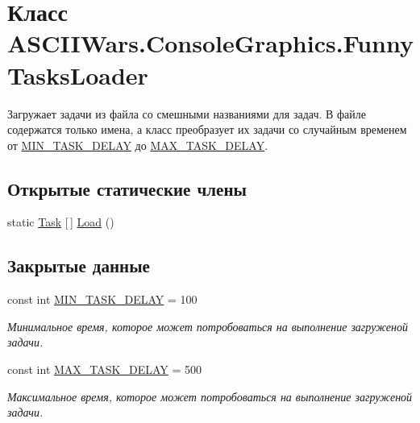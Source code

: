 \hypertarget{class_a_s_c_i_i_wars_1_1_console_graphics_1_1_funny_tasks_loader}{}\section{Класс A\+S\+C\+I\+I\+Wars.\+Console\+Graphics.\+Funny\+Tasks\+Loader}
\label{class_a_s_c_i_i_wars_1_1_console_graphics_1_1_funny_tasks_loader}


Загружает задачи из файла со смешными названиями для задач. В файле содержатся только имена, а класс преобразует их задачи со случайным временем от \hyperlink{class_a_s_c_i_i_wars_1_1_console_graphics_1_1_funny_tasks_loader_a9008864a7b23b6e86b350b5c2097151c}{M\+I\+N\+\_\+\+T\+A\+S\+K\+\_\+\+D\+E\+L\+AY} до \hyperlink{class_a_s_c_i_i_wars_1_1_console_graphics_1_1_funny_tasks_loader_a0c34f365b46e3cc7e9974d5412b05f6c}{M\+A\+X\+\_\+\+T\+A\+S\+K\+\_\+\+D\+E\+L\+AY}.  


\subsection*{Открытые статические члены}
\begin{DoxyCompactItemize}
\item 
static \hyperlink{class_a_s_c_i_i_wars_1_1_console_graphics_1_1_task}{Task} \mbox{[}$\,$\mbox{]} \hyperlink{class_a_s_c_i_i_wars_1_1_console_graphics_1_1_funny_tasks_loader_a31fd5789c12ebfb455dc594a35a8316c}{Load} ()
\end{DoxyCompactItemize}
\subsection*{Закрытые данные}
\begin{DoxyCompactItemize}
\item 
const int \hyperlink{class_a_s_c_i_i_wars_1_1_console_graphics_1_1_funny_tasks_loader_a9008864a7b23b6e86b350b5c2097151c}{M\+I\+N\+\_\+\+T\+A\+S\+K\+\_\+\+D\+E\+L\+AY} = 100
\begin{DoxyCompactList}\small\item\em Минимальное время, которое может потробоваться на выполнение загруженой задачи. \end{DoxyCompactList}\item 
const int \hyperlink{class_a_s_c_i_i_wars_1_1_console_graphics_1_1_funny_tasks_loader_a0c34f365b46e3cc7e9974d5412b05f6c}{M\+A\+X\+\_\+\+T\+A\+S\+K\+\_\+\+D\+E\+L\+AY} = 500
\begin{DoxyCompactList}\small\item\em Максимальное время, которое может потробоваться на выполнение загруженой задачи. \end{DoxyCompactList}\end{DoxyCompactItemize}


